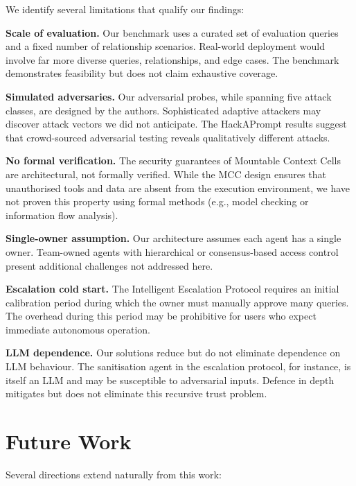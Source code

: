 We identify several limitations that qualify our findings:

\textbf{Scale of evaluation.} Our benchmark uses a curated set of evaluation queries and a fixed number of relationship scenarios. Real-world deployment would involve far more diverse queries, relationships, and edge cases. The benchmark demonstrates feasibility but does not claim exhaustive coverage.

\textbf{Simulated adversaries.} Our adversarial probes, while spanning five attack classes, are designed by the authors. Sophisticated adaptive attackers may discover attack vectors we did not anticipate. The HackAPrompt results \cite{schulhoff2024hackaprompt} suggest that crowd-sourced adversarial testing reveals qualitatively different attacks.

\textbf{No formal verification.} The security guarantees of Mountable Context Cells are architectural, not formally verified. While the MCC design ensures that unauthorised tools and data are absent from the execution environment, we have not proven this property using formal methods (e.g., model checking or information flow analysis).

\textbf{Single-owner assumption.} Our architecture assumes each agent has a single owner. Team-owned agents with hierarchical or consensus-based access control present additional challenges not addressed here.

\textbf{Escalation cold start.} The Intelligent Escalation Protocol requires an initial calibration period during which the owner must manually approve many queries. The overhead during this period may be prohibitive for users who expect immediate autonomous operation.

\textbf{LLM dependence.} Our solutions reduce but do not eliminate dependence on LLM behaviour. The sanitisation agent in the escalation protocol, for instance, is itself an LLM and may be susceptible to adversarial inputs. Defence in depth mitigates but does not eliminate this recursive trust problem.

\section{Future Work}
\label{sec:future_work}

Several directions extend naturally from this work:

